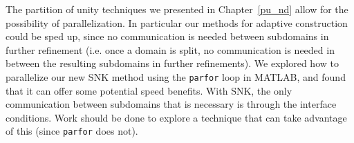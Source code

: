 The partition of unity techniques we presented in Chapter~\ref{pu_nd} allow for the possibility of parallelization. In particular our methods for adaptive construction could be sped up, since no communication is needed between subdomains in further refinement (i.e. once a domain is split, no communication is needed in between the resulting subdomains in further refinements). We explored how to parallelize our new SNK method using the {\tt parfor} loop in MATLAB, and found that it can offer some potential speed benefits. With SNK, the only communication between subdomains that is necessary is through the interface conditions. Work should be done to explore a technique that can take advantage of this (since {\tt parfor} does not).


